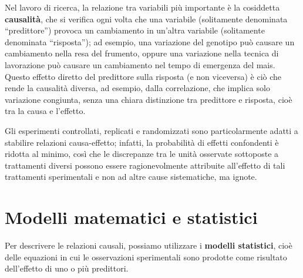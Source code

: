 \documentclass[
  12pt,
]{book}
\begin{document}
Nel lavoro di ricerca, la relazione tra variabili più importante è la cosiddetta \textbf{causalità}, che si verifica ogni volta che una variabile (solitamente denominata ``predittore'') provoca un cambiamento in un'altra variabile (solitamente denominata ``risposta''); ad esempio, una variazione del genotipo può causare un cambiamento nella resa del frumento, oppure una variazione nella tecnica di lavorazione può causare un cambiamento nel tempo di emergenza del mais. Questo effetto diretto del predittore sulla risposta (e non viceversa) è ciò che rende la causalità diversa, ad esempio, dalla correlazione, che implica solo variazione congiunta, senza una chiara distinzione tra predittore e risposta, cioè tra la causa e l'effetto.

Gli esperimenti controllati, replicati e randomizzati sono particolarmente adatti a stabilire relazioni causa-effetto; infatti, la probabilità di effetti confondenti è ridotta al minimo, così che le discrepanze tra le unità osservate sottoposte a trattamenti diversi possono essere ragionevolmente attribuite all'effetto di tali trattamenti sperimentali e non ad altre cause sistematiche, ma ignote.

\hypertarget{modelli-matematici-e-statistici}{%
\section{Modelli matematici e statistici}\label{modelli-matematici-e-statistici}}

Per descrivere le relazioni causali, possiamo utilizzare i \textbf{modelli statistici}, cioè delle equazioni in cui le osservazioni sperimentali sono prodotte come risultato dell'effetto di uno o più predittori.
\end{document}
